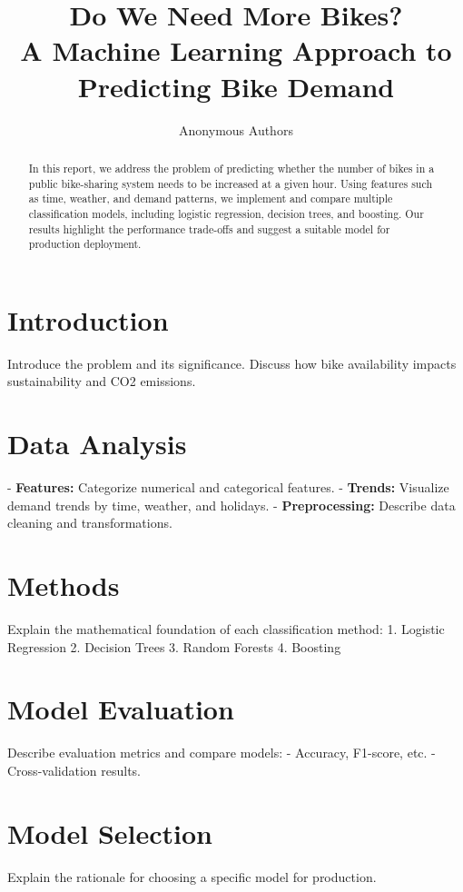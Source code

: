 \documentclass{article}
\title{Do We Need More Bikes? \\ A Machine Learning Approach to Predicting Bike Demand}
\author{Anonymous Authors} %
\begin{document}
\maketitle

\begin{abstract}
In this report, we address the problem of predicting whether the number of bikes in a public bike-sharing system needs to be increased at a given hour. Using features such as time, weather, and demand patterns, we implement and compare multiple classification models, including logistic regression, decision trees, and boosting. Our results highlight the performance trade-offs and suggest a suitable model for production deployment.
\end{abstract}





\section{Introduction} %
Introduce the problem and its significance. Discuss how bike availability impacts sustainability and CO2 emissions.

\section{Data Analysis}
- \textbf{Features:} Categorize numerical and categorical features.
- \textbf{Trends:} Visualize demand trends by time, weather, and holidays.
- \textbf{Preprocessing:} Describe data cleaning and transformations.

\section{Methods}
Explain the mathematical foundation of each classification method:
1. Logistic Regression
2. Decision Trees
3. Random Forests
4. Boosting

\section{Model Evaluation}
Describe evaluation metrics and compare models:
- Accuracy, F1-score, etc.
- Cross-validation results.

\section{Model Selection}
Explain the rationale for choosing a specific model for production.
\end{document}

